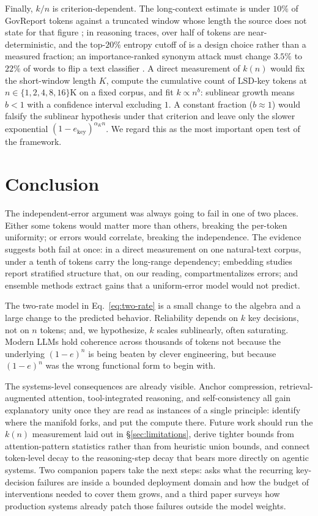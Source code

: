 Finally, $k/n$ is criterion-dependent. The long-context estimate is under $10\%$ of GovReport tokens against a truncated window whose length the source does not state for that figure \citep{fang2024what}; in reasoning traces, over half of tokens are near-deterministic, and the top-$20\%$ entropy cutoff of \citet{wang2025beyond8020} is a design choice rather than a measured fraction; an importance-ranked synonym attack must change $3.5\%$ to $22\%$ of words to flip a text classifier \citep{jin2020textfooler}. A direct measurement of $k(n)$ would fix the short-window length $K$, compute the cumulative count of LSD-key tokens at $n \in \{1, 2, 4, 8, 16\}$K on a fixed corpus, and fit $k \propto n^{b}$: sublinear growth means $b < 1$ with a confidence interval excluding $1$. A constant fraction ($b \approx 1$) would falsify the sublinear hypothesis under that criterion and leave only the slower exponential $(1-e_{\text{key}})^{\alpha_K n}$. We regard this as the most important open test of the framework.

\section{Conclusion}
\label{sec:conclusion}

The independent-error argument was always going to fail in one of two places. Either some tokens would matter more than others, breaking the per-token uniformity; or errors would correlate, breaking the independence. The evidence suggests both fail at once: in a direct measurement on one natural-text corpus, under a tenth of tokens carry the long-range dependency; embedding studies report stratified structure that, on our reading, compartmentalizes errors; and ensemble methods extract gains that a uniform-error model would not predict.

The two-rate model in Eq.~\ref{eq:two-rate} is a small change to the algebra and a large change to the predicted behavior. Reliability depends on $k$ key decisions, not on $n$ tokens; and, we hypothesize, $k$ scales sublinearly, often saturating. Modern LLMs hold coherence across thousands of tokens not because the underlying $(1-e)^n$ is being beaten by clever engineering, but because $(1-e)^n$ was the wrong functional form to begin with.

The systems-level consequences are already visible. Anchor compression, retrieval-augmented attention, tool-integrated reasoning, and self-consistency all gain explanatory unity once they are read as instances of a single principle: identify where the manifold forks, and put the compute there. Future work should run the $k(n)$ measurement laid out in \S\ref{sec:limitations}, derive tighter bounds from attention-pattern statistics rather than from heuristic union bounds, and connect token-level decay to the reasoning-step decay that bears more directly on agentic systems. Two companion papers take the next steps: \citet{arbuzov2026architecture} asks what the recurring key-decision failures are inside a bounded deployment domain and how the budget of interventions needed to cover them grows, and a third paper surveys how production systems already patch those failures outside the model weights.

